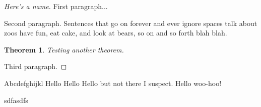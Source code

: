 \documentclass[math-packages]{isuthesistagged}
\newcommand{\withSpace}{Hello }
\newtheorem{theorem}{Theorem}
\begin{document}
\frontmattersetup
\begin{proof}[Here's a name]
    First paragraph...

    Second paragraph. Sentences that go on forever and ever ignore spaces talk about zoos have fun, eat cake, and look at bears, so on and so forth blah blah.

    \begin{theorem}
        Testing another theorem.
    \end{theorem}

    Third paragraph.
\end{proof}
Abcdefghijkl \withSpace\withSpace\withSpace but not there I suspect. \withSpace woo-hoo!

sdfasdfs
\end{document}
